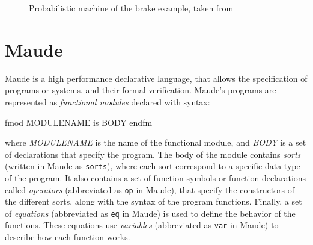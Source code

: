 \begin{figure}[h]
    \quad
    \caption{Probabilistic machine of the brake example, taken from \cite{Aouadhi2017}}
    \label{fig:brake3}
\end{figure}




\section{Maude}

Maude \cite{MaudeManual, PeterMaude, Lecture1} is a high performance declarative language, that allows the specification of programs or systems, and their formal verification.
Maude's programs are represented as \textit{functional modules} declared with syntax: \\

\begin{maude}
fmod MODULENAME is
    BODY
endfm
\end{maude}
where \textit{MODULENAME} is the name of the functional module, and \textit{BODY} is a set of declarations that specify the program. The body of the module contains \textit{sorts} (written in Maude as \texttt{sorts}), where each sort correspond to a specific data type of the program. It also contains a set of function symbols or function declarations called \textit{operators} (abbreviated as \texttt{op} in Maude), that specify the constructors of the different sorts, along with the syntax of the program functions. Finally, a set of \textit{equations} (abbreviated as \texttt{eq} in Maude) is used to define the behavior of the functions. These equations use \textit{variables} (abbreviated as \texttt{var} in Maude) to describe how each function works. 

